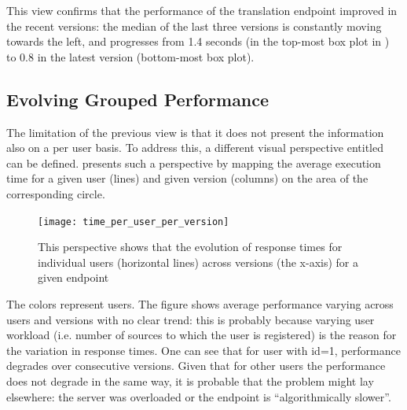   This view confirms that the performance of the translation endpoint improved in the recent versions: the median of the last three versions is constantly moving towards the left, and progresses from 1.4 seconds (in the top-most box plot in ) to 0.8 in the latest version (bottom-most box plot).


\subsection*{Evolving Grouped Performance}
  The limitation of the previous view is that it does not present the information also on a per user basis. To address this, a different visual perspective entitled  can be defined.  presents such a perspective by mapping the average execution time for a given user (lines) and given version (columns) on the area of the corresponding circle. 

\begin{figure}[h!]
  \centering
  \texttt{[image: time\_per\_user\_per\_version]}
  \caption{This perspective shows that the evolution of response times for individual users (horizontal lines) across versions (the x-axis) for a given endpoint}
  \label{fig:tuv}
\end{figure}


The colors represent users. The figure shows average performance varying  across users and versions with no clear trend: this is probably because varying user workload (i.e. number of sources to which the user is registered) is the reason for the variation in response times. One can see that for user with id=1, performance degrades over consecutive versions. Given that for other users the performance does not degrade in the same way, it is probable that the problem might lay elsewhere: the server was overloaded or the endpoint is ``algorithmically slower''. 


  
